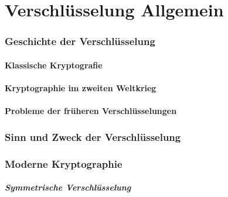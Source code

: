 \part{Verschlüsselung Allgemein}
\section{Geschichte der Verschlüsselung}
\subsection{Klassische Kryptografie}
\subsection{Kryptographie im zweiten Weltkrieg}
\subsection{Probleme der früheren Verschlüsselungen}

\section{Sinn und Zweck der Verschlüsselung}

\section{Moderne Kryptographie}

\subsubsection{Symmetrische Verschlüsselung}
